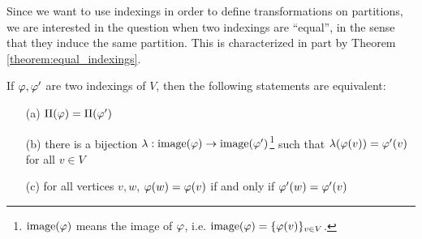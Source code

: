Since we want to use indexings in order to define transformations on partitions, we are interested in the question when two indexings are ``equal'', in the sense that they induce the same partition. This is characterized in part by Theorem \ref{theorem:equal_indexings}.

\begin{theoremrep}
    If $\varphi,\varphi'$ are two indexings of $V$, then the following statements are equivalent:
    \begin{enumerate}
        \item[(a)] $\Pi(\varphi)=\Pi(\varphi')$
        \item[(b)] there is a bijection $\lambda : \mathrm{image}(\varphi) \rightarrow \mathrm{image}(\varphi')$\footnote{$\mathrm{image}(\varphi)$ means the image of $\varphi$, i.e. $\mathrm{image}(\varphi)=\{ \varphi(v) \}_{v \in V}$.} such that $\lambda(\varphi(v)) = \varphi'(v)$ for all $v \in V$
        \item[(c)] for all vertices $v,w$, $\varphi(w) = \varphi(v)$ if and only if $\varphi'(w) = \varphi'(v)$
    \end{enumerate} \label{theorem:equal_indexings}
\end{theoremrep}
